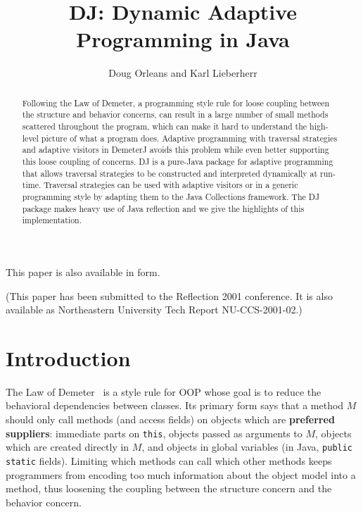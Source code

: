 \documentclass{llncs}
\title{DJ: Dynamic Adaptive Programming in Java}
\author{Doug Orleans and Karl Lieberherr}
\institute{Northeastern University, Boston, MA 02115, USA}
\newcommand{\defn}[1]{\textbf{#1}}
\newcommand{\code}[1]{\texttt{#1}}
\begin{document}
\begin{htmlonly}
This paper is also available in
 form.
\end{htmlonly}

\maketitle

\noindent (This paper has been submitted to the Reflection 2001 conference.
It is also available as Northeastern University Tech Report NU-CCS-2001-02.)

\begin{abstract}
\noindent
Following the Law of Demeter, a programming style rule for loose
coupling between the structure and behavior concerns, can result in a
large number of small methods scattered throughout the program, which
can make it hard to understand the high-level picture of what a
program does.  Adaptive programming with traversal strategies and
adaptive visitors in DemeterJ avoids this problem while even better
supporting this loose coupling of concerns.  DJ is a pure-Java package
for adaptive programming that allows traversal strategies to be
constructed and interpreted dynamically at run-time.  Traversal
strategies can be used with adaptive visitors or in a generic
programming style by adapting them to the Java Collections framework.
The DJ package makes heavy use of Java reflection and we give the
highlights of this implementation.
\end{abstract}

\section{Introduction}

The Law of Demeter~\cite{karl-ian:soft1} is a style rule for OOP whose
goal is to reduce the behavioral dependencies between classes.  Its
primary form says that a method $M$ should only call methods (and
access fields) on objects which are \defn{preferred suppliers}:
immediate parts on \code{this}, objects passed as arguments to $M$,
objects which are created directly in $M$, and objects in global
variables (in Java, \code{public static} fields).  Limiting which
methods can call which other methods keeps programmers from encoding
too much information about the object model into a method, thus
loosening the coupling between the structure concern and the behavior
concern.
\end{document}
